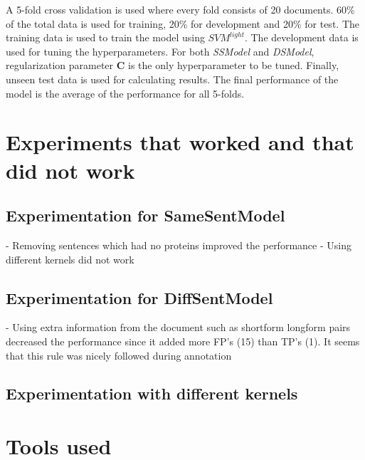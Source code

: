 A 5-fold cross validation is used where every fold consists of 20 documents. 60\% of the total data is used for training, 20\% for development and 20\% for test. The training data is used to train the model using $SVM^{light}$. The development data is used for tuning the hyperparameters. For both \textit{SSModel} and \textit{DSModel}, regularization parameter $\mathbf{C}$ is the only hyperparameter to be tuned.  Finally, unseen test data is used for calculating results. The final performance of the model is the average of the performance for all 5-folds.



\section{Experiments that worked and that did not work}\label{sec:experiments}

\subsection{Experimentation for SameSentModel}

- Removing sentences which had no proteins improved the performance
- Using different kernels did not work

\subsection{Experimentation for DiffSentModel}

- Using extra information from the document such as shortform longform pairs decreased the performance since it added more FP's (15) than TP's (1). It seems that this rule was nicely followed during annotation

\subsection{Experimentation with different kernels}

\section{Tools used}\label{sec:tools}
